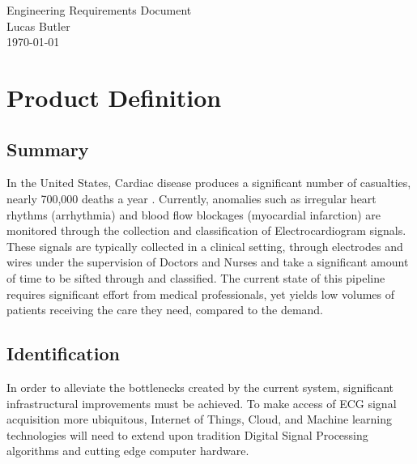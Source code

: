 \documentclass{article}
\begin{document}
\vspace*{\fill}   %

\begin{center}
    {\LARGE Engineering Requirements Document \\}   %
    \vspace{1cm}         %
    {\large Lucas Butler \\}  %
    \vspace{1cm}         %
    {\large \today}      %
\end{center}

\vspace*{\fill}   %

\newpage

\section{Product Definition}
\subsection{Summary}
\quad In the United States, Cardiac disease produces a significant number of casualties, nearly 700,000 deaths a year \cite{cdc}. Currently, anomalies such as irregular heart rhythms (arrhythmia) and blood flow blockages (myocardial infarction) are monitored through the collection and classification of Electrocardiogram signals. These signals are typically collected in a clinical setting, through electrodes and wires under the supervision of Doctors and Nurses and take a significant amount of time to be sifted through and classified. The current state of this pipeline requires significant effort from medical professionals, yet yields low volumes of patients receiving the care they need, compared to the demand. 
\subsection{Identification}
In order to alleviate the bottlenecks created by the current system, significant infrastructural improvements must be achieved. To make access of ECG signal acquisition more ubiquitous, Internet of Things, Cloud, and Machine learning technologies will need to extend upon tradition Digital Signal Processing algorithms and cutting edge computer hardware.
\end{document}
